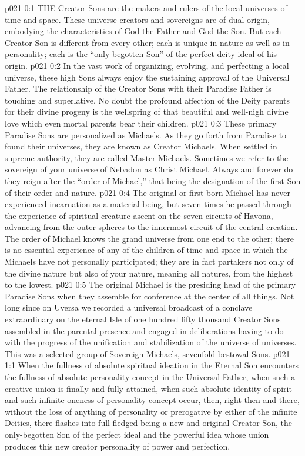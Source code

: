 \vs p021 0:1 THE Creator Sons are the makers and rulers of the local universes of time and space. These universe creators and sovereigns are of dual origin, embodying the characteristics of God the Father and God the Son. But each Creator Son is different from every other; each is unique in nature as well as in personality; each is the “only\hyp{}begotten Son” of the perfect deity ideal of his origin.
\vs p021 0:2 In the vast work of organizing, evolving, and perfecting a local universe, these high Sons always enjoy the sustaining approval of the Universal Father. The relationship of the Creator Sons with their Paradise Father is touching and superlative. No doubt the profound affection of the Deity parents for their divine progeny is the wellspring of that beautiful and well\hyp{}nigh divine love which even mortal parents bear their children.
\vs p021 0:3 These primary Paradise Sons are personalized as Michaels. As they go forth from Paradise to found their universes, they are known as Creator Michaels. When settled in supreme authority, they are called Master Michaels. Sometimes we refer to the sovereign of your universe of Nebadon as Christ Michael. Always and forever do they reign after the “order of Michael,” that being the designation of the first Son of their order and nature.
\vs p021 0:4 \pc The original or first\hyp{}born Michael has never experienced incarnation as a material being, but seven times he passed through the experience of spiritual creature ascent on the seven circuits of Havona, advancing from the outer spheres to the innermost circuit of the central creation. The order of Michael knows the grand universe from one end to the other; there is no essential experience of any of the children of time and space in which the Michaels have not personally participated; they are in fact partakers not only of the divine nature but also of your nature, meaning all natures, from the highest to the lowest.
\vs p021 0:5 The original Michael is the presiding head of the primary Paradise Sons when they assemble for conference at the center of all things. Not long since on Uversa we recorded a universal broadcast of a conclave extraordinary on the eternal Isle of one hundred fifty thousand Creator Sons assembled in the parental presence and engaged in deliberations having to do with the progress of the unification and stabilization of the universe of universes. This was a selected group of Sovereign Michaels, sevenfold bestowal Sons.
\vs p021 1:1 When the fullness of absolute spiritual ideation in the Eternal Son encounters the fullness of absolute personality concept in the Universal Father, when such a creative union is finally and fully attained, when such absolute identity of spirit and such infinite oneness of personality concept occur, then, right then and there, without the loss of anything of personality or prerogative by either of the infinite Deities, there flashes into full\hyp{}fledged being a new and original Creator Son, the only\hyp{}begotten Son of the perfect ideal and the powerful idea whose union produces this new creator personality of power and perfection.
